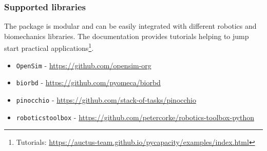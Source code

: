 \subsubsection*{Supported libraries}
The package is modular and can be easily integrated with different robotics and biomechanics libraries. The documentation provides tutorials helping to jump start practical applications\footnote{Tutorials: \url{https://auctus-team.github.io/pycapacity/examples/index.html}}.
\begin{itemize}
    \item \texttt{OpenSim}\cite{opensim} - \url{https://github.com/opensim-org}
    \item \texttt{biorbd}\cite{Michaud2021} - \url{https://github.com/pyomeca/biorbd}
    \item \texttt{pinocchio}\cite{pinocchio2021} - \url{https://github.com/stack-of-tasks/pinocchio}
    \item \texttt{roboticstoolbox}\cite{rtb} - \url{https://github.com/petercorke/robotics-toolbox-python}
\end{itemize}

